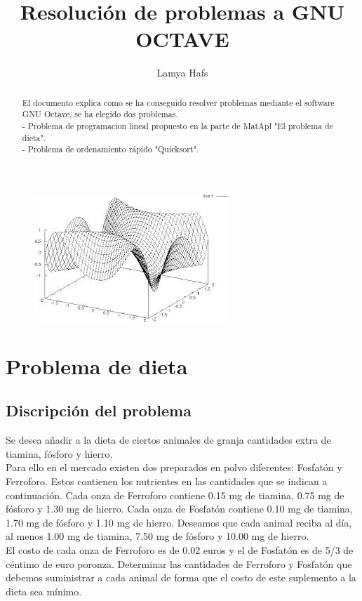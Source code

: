 \documentclass[a4,12pt]{article}
\title{Resolución de problemas a GNU OCTAVE}
\author{Lamya Hafs}
\begin{document}
\maketitle
\bigskip
\bigskip
\bigskip
\begin{figure}[H]
  \centering
    \includegraphics{imagenes/octave}
\end{figure}
\newpage

\maketitle

\begin{abstract}
El documento explica como se ha conseguido resolver problemas mediante el software GNU Octave, se ha elegido dos problemas.\\
- Problema de programacion lineal propuesto en la parte de MatApl "El problema de dieta".\\
- Problema de ordenamiento rápido "Quicksort".\\

\end{abstract}

\tableofcontents
\newpage

\section{Problema de dieta}

\subsection{Discripción del problema}
Se desea añadir a la dieta de ciertos animales de granja cantidades extra de tiamina, fósforo y hierro.\\
Para ello en el mercado existen dos preparados en polvo diferentes: Fosfatón y Ferroforo. Estos
contienen los nutrientes en las cantidades que se indican a continuación. Cada onza de Ferroforo
contiene 0.15 mg de tiamina, 0.75 mg de fósforo y 1.30 mg de hierro. Cada onza de Fosfatón contiene 0.10 mg de tiamina, 1.70 mg de fósforo y 1.10 mg de hierro. Deseamos que cada animal reciba al día, al menos 1.00 mg de tiamina, 7.50 mg de fósforo y 10.00 mg de hierro.\\
El costo de cada onza de Ferroforo es de 0.02 euros y el de Fosfatón es de 5/3 de céntimo de euro poronza. Determinar las cantidades de Ferroforo y Fosfatón que debemos suministrar a cada animal de forma que el costo de este suplemento a la dieta sea mínimo.\\
\end{document}
